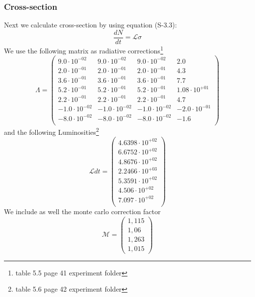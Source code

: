\documentclass[]{article}
\begin{document}
\subsubsection{Cross-section}
Next we calculate cross-section by using equation (S-3.3):
\begin{equation}
\frac{dN}{dt} = \mathcal{L}\sigma
\label{eq:cs}
\end{equation}
We use the following matrix as radiative corrections\footnote{table 5.5 page 41 experiment folder}
\begin{equation}
\Lambda = \begin{pmatrix}
   9.0\cdot 10^{-02} & 9.0\cdot 10^{-02} & 9.0\cdot 10^{-02} & 2.0 \\
   2.0\cdot 10^{-01} & 2.0\cdot 10^{-01} & 2.0\cdot 10^{-01} & 4.3 \\
   3.6\cdot 10^{-01} & 3.6\cdot 10^{-01} & 3.6\cdot 10^{-01} & 7.7 \\
   5.2\cdot 10^{-01} & 5.2\cdot 10^{-01} & 5.2\cdot 10^{-01} & 1.08\cdot 10^{+01} \\
   2.2\cdot 10^{-01} & 2.2\cdot 10^{-01} & 2.2\cdot 10^{-01} & 4.7 \\
   -1.0\cdot 10^{-02} & -1.0\cdot 10^{-02} & -1.0\cdot 10^{-02} & -2.0\cdot 10^{-01} \\
   -8.0\cdot 10^{-02} & -8.0\cdot 10^{-02} & -8.0\cdot 10^{-02} & -1.6 \\
\end{pmatrix}
\end{equation}
and the following Luminosities\footnote{ table 5.6 page 42 experiment folder}
\begin{equation}
\mathcal{L}dt = \begin{pmatrix}
   4.6398\cdot 10^{+02} \\
   6.6752\cdot 10^{+02} \\
   4.8676\cdot 10^{+02} \\
   2.2466\cdot 10^{+03} \\
   5.3591\cdot 10^{+02} \\
   4.506\cdot 10^{+02} \\
   7.097\cdot 10^{+02} \\
\end{pmatrix}
\end{equation}
We include as well the monte carlo correction factor
\begin{equation}
\mathcal{M} = \begin{pmatrix}
  1,115 \\
   1,06 \\
    1,263 \\
     1,015 
\end{pmatrix}
\end{equation}
\end{document}
